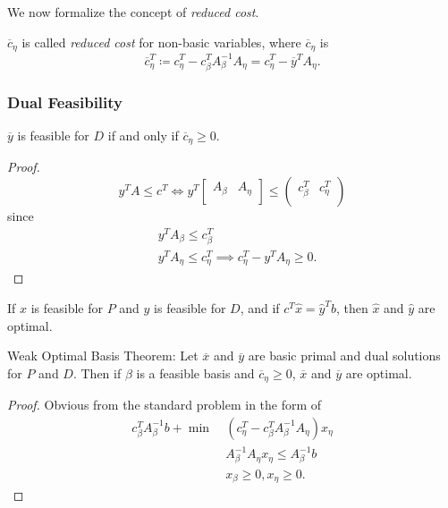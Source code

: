 We now formalize the concept of \emph{reduced cost}.
\begin{definition}
	\(\overline{c}_{\eta}\) is called \emph{reduced cost} for non-basic variables, where \(\overline{c}_{\eta}\) is
	\[
		\overline{c}_{\eta}^{T} \coloneqq c_{\eta}^{T} - c_{\beta}^{T} A^{-1}_{\beta}A_{\eta} = c_{\eta}^{T} - \overline{y}^{T}A_{\eta}.
	\]
\end{definition}

\subsubsection{Dual Feasibility}
\begin{lemma}
	\(\overline{y}\) is feasible for \(D\) if and only if \(\overline{c}_{\eta}\geq 0\).
\end{lemma}
\begin{proof}
	\[
		y^{T}A\leq c^{T} \iff y^{T}\begin{bmatrix}
			A_{\beta} & A_{\eta} \\
		\end{bmatrix}\leq \begin{pmatrix}
			c_{\beta}^{T} & c_{\eta}^{T} \\
		\end{pmatrix}
	\]
	since
	\[
		\begin{alignedat}{3}
			&y^{T} A_{\beta}\leq c_{\beta}^{T}\\
			&y^{T} A_{\eta}\leq c_{\eta}^{T} \implies c_{\eta}^{T} - y^{T}A_{\eta}\geq 0.
		\end{alignedat}
	\]
\end{proof}

\begin{corollary}
	If \(\hat{x}\) is feasible for \(P\) and \(\hat{y}\) is feasible for \(D\), and if \(c^{T}\hat{x} = \hat{y}^{T} b\), then \(\hat{x}\) and \(\hat{y}\) are optimal.
\end{corollary}

\begin{theorem}
	Weak Optimal Basis Theorem: Let \(\overline{x}\) and \(\overline{y}\) are basic primal and dual solutions for \(P\) and \(D\). Then if \(\beta\) is a feasible basis and \(\overline{c}_{\eta}\geq 0\), \(\overline{x}\) and
	\(\overline{y}\) are optimal.
\end{theorem}
\begin{proof}
	Obvious from the standard problem in the form of
	\begin{align*}
		c^{T}_{\beta}A^{-1}_{\beta}b + \min~ & (c_{\eta}^{T} - c_{\beta}^{T}A^{-1}_{\beta}A_{\eta})x_{\eta} \\
		                                     & A^{-1}_{\beta}A_{\eta}x_{\eta} \leq A^{-1}_{\beta}b          \\
		                                     & x_{\beta}\geq 0, x_{\eta}\geq 0.
	\end{align*}
\end{proof}

